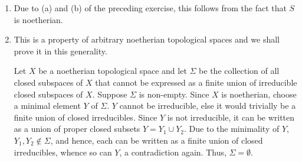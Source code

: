 \begin{exercise}
\begin{enumerate}[label=(\alph*)]
    \item Due to (a) and (b) of the preceding exercise, this follows from the fact that $S$ is noetherian. 
    \item This is a property of arbitrary noetherian topological spaces and we shall prove it in this generality.

    Let $X$ be a noetherian topological space and let $\Sigma$ be the collection of all closed subspaces of $X$ that cannot be expressed as a finite union of irreducible closed subspaces of $X$. Suppose $\Sigma$ is non-empty. Since $X$ is noetherian, choose a minimal element $Y$ of $\Sigma$. $Y$ cannot be irreducible, else it would trivially be a finite union of closed irreducibles. Since $Y$ is not irreducible, it can be written as a union of proper closed subsets $Y = Y_1\cup Y_2$. Due to the minimality of $Y$, $Y_1, Y_2\notin\Sigma$, and hence, each can be written as a finite union of closed irreducibles, whence so can $Y$, a contradiction again. Thus, $\Sigma = \emptyset$.
\end{enumerate}
\end{exercise}

